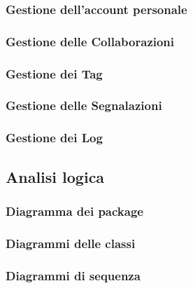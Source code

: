 \documentclass{article}
\begin{document}
\subsubsection{Gestione dell'account personale}

\subsubsection{Gestione delle Collaborazioni}

\subsubsection{Gestione dei Tag}

\subsubsection{Gestione delle Segnalazioni}

\subsubsection{Gestione dei Log}


\subsection{Analisi logica}
\subsubsection{Diagramma dei package}

\subsubsection{Diagrammi delle classi}




\subsubsection{Diagrammi di sequenza}





\end{document}
